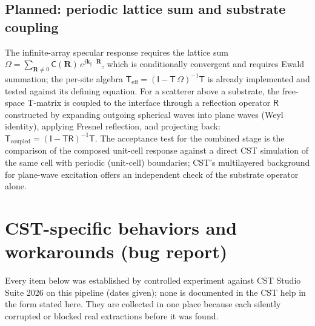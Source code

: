 \documentclass[11pt]{article}
\newcommand{\kk}{\mathbf{k}}
\begin{document}
\subsection{Planned: periodic lattice sum and substrate coupling}
The infinite-array specular response requires the lattice sum
$\Omega = \sum_{\mathbf{R}\neq 0} \mathsf{C}(\mathbf{R})\,
e^{j\kk_\parallel\cdot\mathbf{R}}$, which is conditionally convergent
and requires Ewald summation; the per-site algebra
$\mathsf{T}_{\mathrm{eff}} = (\mathsf{I} -
\mathsf{T}\,\Omega)^{-1}\mathsf{T}$ is already implemented and tested
against its defining equation.  For a scatterer above a substrate, the
free-space T-matrix is coupled to the interface through a reflection
operator $\mathsf{R}$ constructed by expanding outgoing spherical waves
into plane waves (Weyl identity), applying Fresnel reflection, and
projecting back: $\mathsf{T}_{\mathrm{coupled}} = (\mathsf{I} -
\mathsf{T}\mathsf{R})^{-1}\mathsf{T}$.  The acceptance test for the
combined stage is the comparison of the composed unit-cell response
against a direct CST simulation of the same cell with periodic
(unit-cell) boundaries; CST's multilayered background for plane-wave
excitation offers an independent check of the substrate operator
alone.

\appendix
\section{CST-specific behaviors and workarounds (bug report)}
\label{app:cstbugs}
Every item below was established by controlled experiment against CST
Studio Suite 2026 on this pipeline (dates given); none is documented in
the CST help in the form stated here.  They are collected in one place
because each silently corrupted or blocked real extractions before it
was found.
\end{document}
